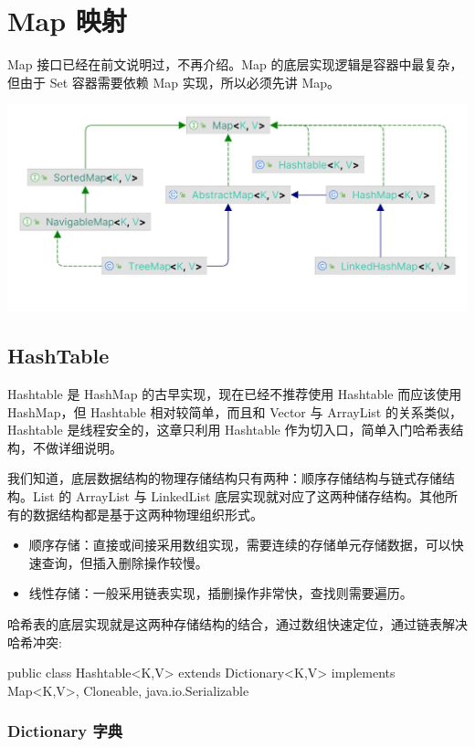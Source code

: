 \section{Map 映射}

Map 接口已经在前文说明过，不再介绍。Map 的底层实现逻辑是容器中最复杂，但由于 Set 容器需要依赖 Map 实现，所以必须先讲 Map。

\begin{center}
    \includegraphics[width=0.8\linewidth]{../../../imgs/Map.jpg}
\end{center}

\subsection{HashTable}

Hashtable 是 HashMap 的古早实现，现在已经不推荐使用 Hashtable 而应该使用 HashMap，但 Hashtable 相对较简单，而且和 Vector 与 ArrayList 的关系类似，Hashtable 是线程安全的，这章只利用 Hashtable 作为切入口，简单入门哈希表结构，不做详细说明。

我们知道，底层数据结构的物理存储结构只有两种：顺序存储结构与链式存储结构。List 的 ArrayList 与 LinkedList 底层实现就对应了这两种储存结构。其他所有的数据结构都是基于这两种物理组织形式。

\begin{itemize}
    \item 顺序存储：直接或间接采用数组实现，需要连续的存储单元存储数据，可以快速查询，但插入删除操作较慢。
    \item 线性存储：一般采用链表实现，插删操作非常快，查找则需要遍历。
\end{itemize}

哈希表的底层实现就是这两种存储结构的结合，通过数组快速定位，通过链表解决哈希冲突:

\begin{Java}
public class Hashtable<K,V> extends Dictionary<K,V> implements Map<K,V>, Cloneable, java.io.Serializable
\end{Java}

\subsubsection{Dictionary 字典}

